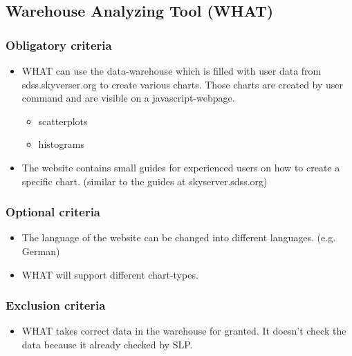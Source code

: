 \subsection{Warehouse Analyzing Tool (WHAT)}

\subsubsection{Obligatory criteria}
\begin{itemize}
\item WHAT can use the data-warehouse which is filled with user data  
from sdss.skyverser.org to create various charts. 
Those charts are created by user command and are visible on a javascript-webpage.
\begin{itemize}
\item scatterplots
\item histograms
\end{itemize}
\item The website contains small guides for experienced users on how to create a specific chart. 
(similar to the guides at skyserver.sdss.org)
\end{itemize}

\subsubsection{Optional criteria}
\begin{itemize}
\item The language of the website can be changed into different languages. (e.g. German)
\item WHAT will support different chart-types.
\end{itemize}

\subsubsection{Exclusion criteria}
\begin{itemize}
\item WHAT takes correct data in the warehouse for granted. It doesn't check the
 data because it already checked by SLP. 
\end{itemize}
